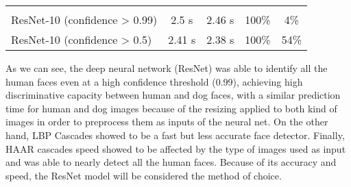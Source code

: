 \documentclass[11pt]{article}
\begin{document}
\begin{longtable}[]{@{}lcccc@{}}
\begin{minipage}[t]{0.08\columnwidth}
\end{minipage}\tabularnewline
\begin{minipage}[t]{0.07\columnwidth}\raggedright\strut
ResNet-10 (confidence \textgreater{} 0.99)\strut
\end{minipage} & \begin{minipage}[t]{0.08\columnwidth}\centering\strut
2.5 s\strut
\end{minipage} & \begin{minipage}[t]{0.08\columnwidth}\centering\strut
2.46 s\strut
\end{minipage} & \begin{minipage}[t]{0.08\columnwidth}\centering\strut
100\%\strut
\end{minipage} & \begin{minipage}[t]{0.08\columnwidth}\centering\strut
4\%\strut
\end{minipage}\tabularnewline
\begin{minipage}[t]{0.07\columnwidth}\raggedright\strut
ResNet-10 (confidence \textgreater{} 0.5)\strut
\end{minipage} & \begin{minipage}[t]{0.08\columnwidth}\centering\strut
2.41 s\strut
\end{minipage} & \begin{minipage}[t]{0.08\columnwidth}\centering\strut
2.38 s\strut
\end{minipage} & \begin{minipage}[t]{0.08\columnwidth}\centering\strut
100\%\strut
\end{minipage} & \begin{minipage}[t]{0.08\columnwidth}\centering\strut
54\%\strut
\end{minipage}\tabularnewline
\bottomrule
\end{longtable}

    As we can see, the deep neural network (ResNet) was able to identify all
the human faces even at a high confidence threshold (0.99), achieving
high discriminative capacity between human and dog faces, with a similar
prediction time for human and dog images because of the resizing applied
to both kind of images in order to preprocess them as inputs of the
neural net. On the other hand, LBP Cascades showed to be a fast but less
accurate face detector. Finally, HAAR cascades speed showed to be
affected by the type of images used as input and was able to nearly
detect all the human faces. Because of its accuracy and speed, the
ResNet model will be considered the method of choice.
\end{document}
